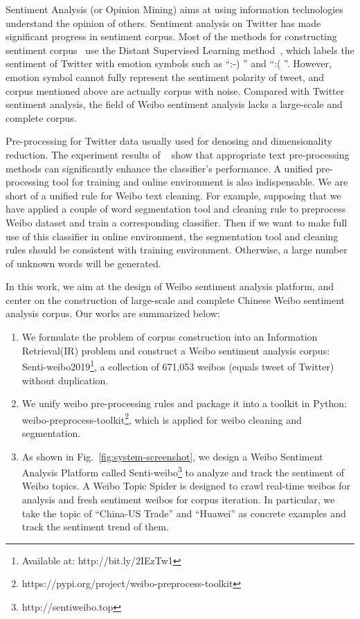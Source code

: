 \documentclass[runningheads]{llncs}
\begin{document}
Sentiment Analysis (or Opinion Mining) aims at using information technologies understand the opinion of others. Sentiment analysis on Twitter has made significant progress in sentiment corpus. Most of the methods for constructing sentiment corpus~\cite{iosifidis2017large} use the Distant Supervised Learning method~\cite{go2009twitter}, which labels the sentiment of Twitter with emotion symbols such as ``:-) '' and ``:( ''. However, emotion symbol cannot fully represent the sentiment polarity of tweet, and corpus mentioned above are actually corpus with noise. Compared with Twitter sentiment analysis, the field of Weibo sentiment analysis lacks a large-scale and complete corpus.

Pre-processing for Twitter data usually used for denosing and dimensionality reduction. The experiment results of ~\cite{haddi2013role} show that appropriate text pre-processing methods can significantly enhance the classifier's performance. A unified pre-processing tool for training and online environment is also indispensable. We are short of a unified rule for Weibo text cleaning. For example, supposing that we have applied a couple of word segmentation tool and cleaning rule to preprocess Weibo dataset and train a corresponding classifier. Then if we want to make full use of this classifier in online environment, the segmentation tool and cleaning rules should be consistent with training environment. Otherwise, a large number of unknown words will be generated.

In this work, we aim at the design of Weibo sentiment analysis platform, and center on the construction of large-scale and complete Chinese Weibo sentiment analysis corpus. Our works are summarized below:

\begin{enumerate}
\item We formulate the problem of corpus construction into an Information Retrieval(IR) problem and construct a Weibo sentiment analysis corpus: Senti-weibo2019\footnote{Available at: http://bit.ly/2IEzTw1}, a collection of 671,053 weibos (equals tweet of Twitter) without duplication.

\item We unify weibo pre-processing rules and package it into a toolkit in Python: weibo-preprocess-toolkit\footnote{https://pypi.org/project/weibo-preprocess-toolkit}, which is applied for weibo cleaning and segmentation. 

\item As shown in Fig.~\ref{fig:system-screenshot}, we design a Weibo Sentiment Analysis Platform called Senti-weibo\footnote{http://sentiweibo.top} to analyze and track the sentiment of Weibo topics. A Weibo Topic Spider is designed to crawl real-time weibos for analysis and fresh sentiment weibos for corpus iteration. In particular, we take the topic of ``China-US Trade'' and ``Huawei'' as concrete examples and track the sentiment trend of them.
\end{enumerate}
\end{document}
